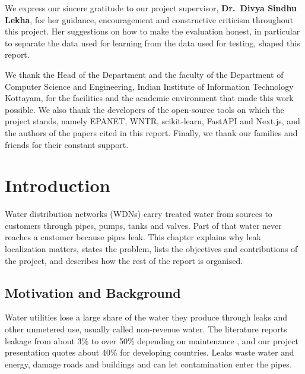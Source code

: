 \documentclass[11pt,letterpaper]{report}
\theoremstyle{definition}
\theoremstyle{plain}
\theoremstyle{remark}
\begin{document}
\begin{center}\vspace*{0.7in}{\large\bfseries ACKNOWLEDGMENT}\end{center}
\vspace{0.1in}
We express our sincere gratitude to our project supervisor, \textbf{Dr.\ Divya Sindhu Lekha}, for her guidance, encouragement and constructive criticism throughout this project. Her suggestions on how to make the evaluation honest, in particular to separate the data used for learning from the data used for testing, shaped this report.

We thank the Head of the Department and the faculty of the Department of Computer Science and Engineering, Indian Institute of Information Technology Kottayam, for the facilities and the academic environment that made this work possible. We also thank the developers of the open-source tools on which the project stands, namely EPANET, WNTR, scikit-learn, FastAPI and Next.js, and the authors of the papers cited in this report. Finally, we thank our families and friends for their constant support.
\clearpage

\tableofcontents
\clearpage
{}
\listoffigures
\clearpage
{}
\listoftables
\clearpage
{}

\chapter{Introduction}
Water distribution networks (WDNs) carry treated water from sources to customers through pipes, pumps, tanks and valves. Part of that water never reaches a customer because pipes leak. This chapter explains why leak localization matters, states the problem, lists the objectives and contributions of the project, and describes how the rest of the report is organised.

\section{Motivation and Background}
Water utilities lose a large share of the water they produce through leaks and other unmetered use, usually called non-revenue water. The literature reports leakage from about 3\% to over 50\% depending on maintenance \cite{sousa2026review}, and our project presentation quotes about 40\% for developing countries. Leaks waste water and energy, damage roads and buildings and can let contamination enter the pipes.
\end{document}
